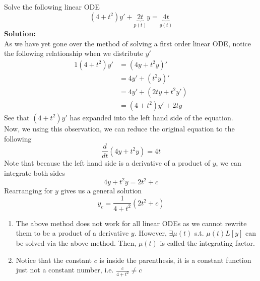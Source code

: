 \documentclass[diffeq.tex]{subfiles}
\begin{document}
    \begin{example}
        \label{ex2-2}
        Solve the following linear ODE
        \begin{equation}
            \left(4 + t^{2}\right)y' + \underbrace{2t}_{p(t)}y = \underbrace{4t}_{g(t)}
        \end{equation}
        \textbf{Solution:}\\[1em]
        As we have yet gone over the method of solving a first order linear ODE, notice the following relationship when we distribute $y'$
        \begin{alignat}{1}
            (4 + t^{2}) y' &= (4y + t^{2}y)'\\
            &= 4y' + (t^{2}y)'\\
            &= 4y' + (2ty + t^{2}y')\\
            &= (4 + t^2)y' + 2ty
        \end{alignat}
        See that $(4 + t^{2})y'$ has expanded into the left hand side of the equation.\\[1em]
        Now, we using this observation, we can reduce the original equation to the following
        \begin{equation}
            \frac{d}{dt}(4y + t^{2}y) = 4t
        \end{equation}
        Note that because the left hand side is a derivative of a product of $y$, we can integrate both sides
        \begin{equation}
            4y + t^{2}y = 2t^{2} + c
        \end{equation}
        Rearranging for $y$ gives us a general solution
        \begin{equation}
            y_c = \frac{1}{4 + t^{2}}(2t^{2} + c)
        \end{equation}
    \end{example}
    \begin{remark}
        \begin{enumerate}
            \item The above method does not work for all linear ODEs as we cannot rewrite them to be a product of a derivative $y$. However, $\exists \mu(t)$ s.t. $\mu(t)L[y]$ can be solved via the above method. Then, $\mu(t)$ is called the integrating factor.
            \item Notice that the constant $c$ is inside the parenthesis, it is a constant function just not a constant number, i.e. $\frac{c}{4 + t^{2}} \neq c$
        \end{enumerate}
    \end{remark}
\end{document}
